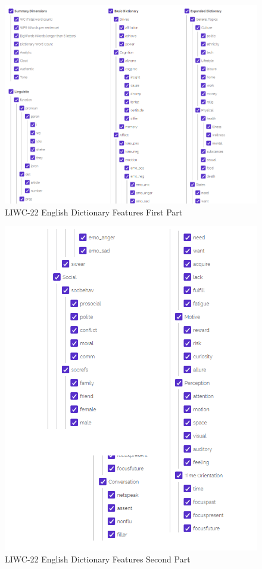 \begin{figure}[htbp]
	\centering
		\includegraphics[scale=0.5]{./figures/LIWC22EnglishFeatures1.png}
	\caption{LIWC-22 English Dictionary Features First Part }
	\label{LIWC22EnglishDicF1}
\end{figure}

\begin{figure}[htbp]
	\centering
		\includegraphics[scale=0.65]{./figures/LIWC22EnglishFeatures2.png}
	\caption{LIWC-22 English Dictionary Features Second Part }
	\label{LIWC22EnglishDicF2}
\end{figure}



